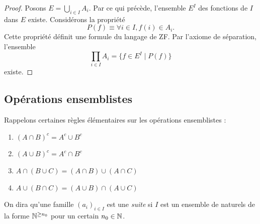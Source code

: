     \begin{proof}
    Posons $E = \bigcup_{i \in I} A_i$. Par ce qui précède, l'ensemble $E^I$ des fonctions de $I$ dans $E$ existe. Considérons la propriété
    $$P(f) \equiv \forall i \in I, f(i) \in A_i.$$
    Cette propriété définit une formule du langage de ZF. Par l'axiome de séparation, l'ensemble
    $$\prod_{i \in I} A_i = \{f \in E^I \mid P(f)\}$$
    existe.
\end{proof}


\subsection{Opérations ensemblistes}
Rappelons certaines règles élémentaires sur les opérations ensemblistes :
\begin{enumerate}
    \item $(A\cap B)^c=A^c\cup B^c$
    \item $(A \cup B)^c = A^c \cap B^c$
    \item $A\cap(B\cup C)=(A\cap B)\cup (A\cap C)$
    \item $A\cup(B\cap C)=(A\cup B)\cap (A\cup C)$
\end{enumerate}
\begin{remarque}
    On dira qu'une famille $(a_i)_{i\in I}$ est une \emph{suite} si $I$ est un ensemble de naturels de la forme $\mathbb{N} ^{\geq n_0}$ pour un certain $n_0\in \mathbb{N}$.
\end{remarque}

